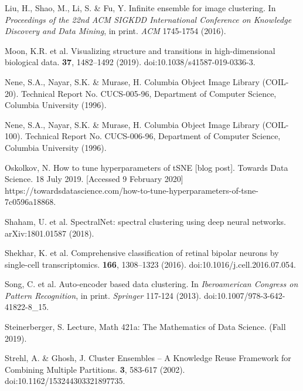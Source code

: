 \documentclass{article}
\begin{document}
\begin{thebibliography}{1}
Liu, H., Shao, M., Li, S. \& Fu, Y.
\newblock Infinite ensemble for image clustering.
\newblock In {\em Proceedings of the 22nd ACM SIGKDD International Conference on Knowledge Discovery and Data Mining}, in print. {\em ACM} 1745-1754 (2016).

Moon, K.R. et al.
\newblock Visualizing structure and transitions in high-dimensional biological data.
 \textbf{37}, 1482–1492 (2019). doi:10.1038/s41587-019-0336-3.

Nene, S.A., Nayar, S.K. \& Murase, H.
\newblock Columbia Object Image Library (COIL-20).
\newblock Technical Report No. CUCS-005-96, Department of Computer Science, Columbia University (1996).

Nene, S.A., Nayar, S.K. \& Murase, H.
\newblock Columbia Object Image Library (COIL-100).
\newblock Technical Report No. CUCS-006-96, Department of Computer Science, Columbia University (1996).

Oskolkov, N.
\newblock How to tune hyperparameters of tSNE [blog post].  
\newblock Towards Data Science. 18 July 2019. [Accessed 9 February 2020] https://towardsdatascience.com/how-to-tune-hyperparameters-of-tsne-7c0596a18868. 

Shaham, U. et al. 
\newblock SpectralNet: spectral clustering using deep neural networks.
 	arXiv:1801.01587 (2018).

Shekhar, K. et al.
\newblock Comprehensive classification of retinal bipolar neurons by single-cell transcriptomics.
 \textbf{166}, 1308–1323 (2016). doi:10.1016/j.cell.2016.07.054.

Song, C. et al.
\newblock Auto-encoder based data clustering.
\newblock In {\em Iberoamerican Congress on Pattern Recognition}, in print. {\em Springer} 117-124 (2013). doi:10.1007/978-3-642-41822-8\_15.

Steinerberger, S.
\newblock Lecture, Math 421a: The Mathematics of Data Science.
 (Fall 2019).

Strehl, A. \& Ghosh, J.
\newblock Cluster Ensembles – A Knowledge Reuse Framework for
Combining Multiple Partitions.
 \textbf{3}, 583-617 (2002). doi:10.1162/153244303321897735.


\end{thebibliography}
\end{document}
